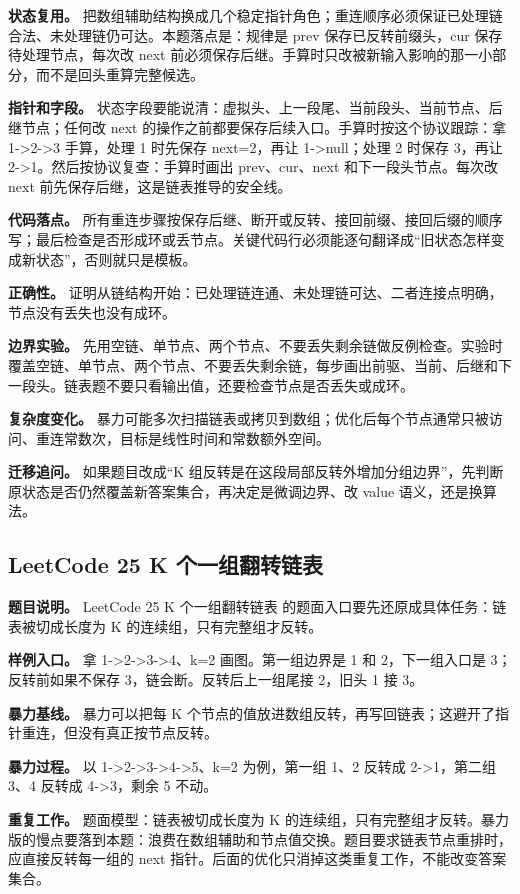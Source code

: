 \textbf{状态复用。} 把数组辅助结构换成几个稳定指针角色；重连顺序必须保证已处理链合法、未处理链仍可达。本题落点是：规律是 prev 保存已反转前缀头，cur 保存待处理节点，每次改 next 前必须保存后继。手算时只改被新输入影响的那一小部分，而不是回头重算完整候选。

\textbf{指针和字段。} 状态字段要能说清：虚拟头、上一段尾、当前段头、当前节点、后继节点；任何改 next 的操作之前都要保存后续入口。手算时按这个协议跟踪：拿 1->2->3 手算，处理 1 时先保存 next=2，再让 1->null；处理 2 时保存 3，再让 2->1。然后按协议复查：手算时画出 prev、cur、next 和下一段头节点。每次改 next 前先保存后继，这是链表推导的安全线。

\textbf{代码落点。} 所有重连步骤按保存后继、断开或反转、接回前缀、接回后缀的顺序写；最后检查是否形成环或丢节点。关键代码行必须能逐句翻译成“旧状态怎样变成新状态”，否则就只是模板。

\textbf{正确性。} 证明从链结构开始：已处理链连通、未处理链可达、二者连接点明确，节点没有丢失也没有成环。

\textbf{边界实验。} 先用空链、单节点、两个节点、不要丢失剩余链做反例检查。实验时覆盖空链、单节点、两个节点、不要丢失剩余链，每步画出前驱、当前、后继和下一段头。链表题不要只看输出值，还要检查节点是否丢失或成环。

\textbf{复杂度变化。} 暴力可能多次扫描链表或拷贝到数组；优化后每个节点通常只被访问、重连常数次，目标是线性时间和常数额外空间。

\textbf{迁移追问。} 如果题目改成“K 组反转是在这段局部反转外增加分组边界”，先判断原状态是否仍然覆盖新答案集合，再决定是微调边界、改 value 语义，还是换算法。

\subsection{LeetCode 25 K 个一组翻转链表}

\textbf{题目说明。} LeetCode 25 K 个一组翻转链表 的题面入口要先还原成具体任务：链表被切成长度为 K 的连续组，只有完整组才反转。

\textbf{样例入口。} 拿 1->2->3->4、k=2 画图。第一组边界是 1 和 2，下一组入口是 3；反转前如果不保存 3，链会断。反转后上一组尾接 2，旧头 1 接 3。

\textbf{暴力基线。} 暴力可以把每 K 个节点的值放进数组反转，再写回链表；这避开了指针重连，但没有真正按节点反转。

\textbf{暴力过程。} 以 1->2->3->4->5、k=2 为例，第一组 1、2 反转成 2->1，第二组 3、4 反转成 4->3，剩余 5 不动。

\textbf{重复工作。} 题面模型：链表被切成长度为 K 的连续组，只有完整组才反转。暴力版的慢点要落到本题：浪费在数组辅助和节点值交换。题目要求链表节点重排时，应直接反转每一组的 next 指针。后面的优化只消掉这类重复工作，不能改变答案集合。

